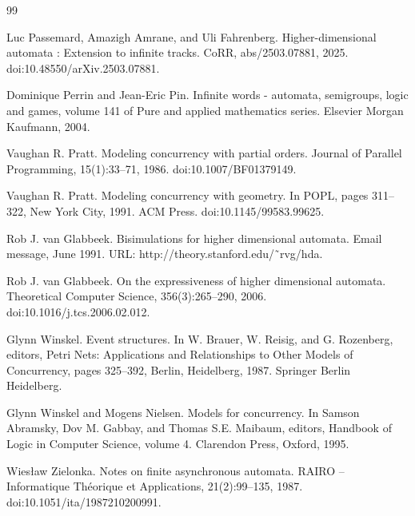 \documentclass[10pt,a4paper]{article}
\begin{document}
\begin{thebibliography}{99}
\par\noindent    Luc Passemard, Amazigh Amrane, and Uli Fahrenberg.  Higher-dimensional automata : Extension to infinite tracks.  CoRR, abs/2503.07881, 2025.  doi:10.48550/arXiv.2503.07881.  

\par\noindent    Dominique Perrin and Jean-Eric Pin.  Infinite words - automata, semigroups, logic and games, volume 141 of Pure and applied mathematics series.  Elsevier Morgan Kaufmann, 2004.  

\par\noindent    Vaughan R. Pratt.  Modeling concurrency with partial orders.  Journal of Parallel Programming, 15(1):33–71, 1986.  doi:10.1007/BF01379149.  

\par\noindent    Vaughan R. Pratt.  Modeling concurrency with geometry.  In POPL, pages 311–322, New York City, 1991. ACM Press.  doi:10.1145/99583.99625.  

\par\noindent    Rob J. van Glabbeek.  Bisimulations for higher dimensional automata.  Email message, June 1991.  URL: http://theory.stanford.edu/˜rvg/hda.  

\par\noindent    Rob J. van Glabbeek.  On the expressiveness of higher dimensional automata.  Theoretical Computer Science, 356(3):265–290, 2006.  doi:10.1016/j.tcs.2006.02.012.  

\par\noindent    Glynn Winskel.  Event structures.  In W. Brauer, W. Reisig, and G. Rozenberg, editors, Petri Nets: Applications and Relationships to Other Models of Concurrency, pages 325–392, Berlin, Heidelberg, 1987. Springer Berlin Heidelberg.  

\par\noindent    Glynn Winskel and Mogens Nielsen.  Models for concurrency.  In Samson Abramsky, Dov M. Gabbay, and Thomas S.E. Maibaum, editors, Handbook of Logic in Computer Science, volume 4. Clarendon Press, Oxford, 1995.  

\par\noindent    Wiesław Zielonka.  Notes on finite asynchronous automata.  RAIRO – Informatique Théorique et Applications, 21(2):99–135, 1987.  doi:10.1051/ita/1987210200991.  

\end{thebibliography}
\end{document}
